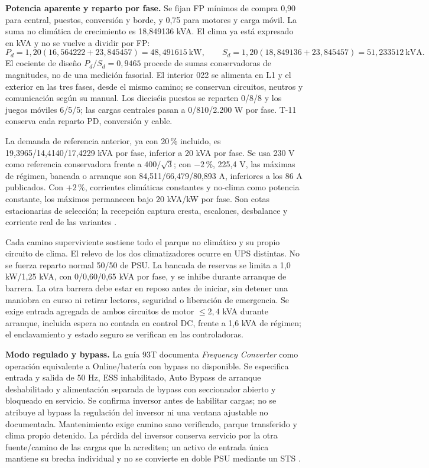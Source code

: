 \textbf{Potencia aparente y reparto por fase.} Se fijan FP mínimos de compra 0,90 para central, puestos, conversión y borde, y 0,75 para motores y carga móvil. La suma no climática de crecimiento es 18,849136 kVA. El clima ya está expresado en kVA y no se vuelve a dividir por FP:
\[
P_d=1,20(16,564222+23,845457)=48,491615\ \mathrm{kW},\qquad
S_d=1,20(18,849136+23,845457)=51,233512\ \mathrm{kVA}.
\]
El cociente de diseño $P_d/S_d=0,9465$ procede de sumas conservadoras de magnitudes, no de una medición fasorial. El interior 022 se alimenta en L1 y el exterior en las tres fases, desde el mismo camino; se conservan circuitos, neutros y comunicación según su manual. Los dieciséis puestos se reparten 0/8/8 y los juegos móviles 6/5/5; las cargas centrales pasan a 0/810/2.200 W por fase. T-11 conserva cada reparto PD, conversión y cable.

La demanda de referencia anterior, ya con 20\,\% incluido, es 19,3965/14,4140/17,4229 kVA por fase, inferior a 20 kVA por fase. Se usa 230 V como referencia conservadora frente a $400/\sqrt{3}$; con $-2\,\%$, 225,4 V, las máximas de régimen, bancada o arranque son 84,511/66,479/80,893 A, inferiores a los 86 A publicados. Con $+2\,\%$, corrientes climáticas constantes y no-clima como potencia constante, los máximos permanecen bajo 20 kVA/kW por fase. Son cotas estacionarias de selección; la recepción captura cresta, escalones, desbalance y corriente real de las variantes \parencites[pp.~3--4]{p7-eaton-93t-tecnica}[pp.~33--35]{p7-eaton-93t-guia}.

Cada camino superviviente sostiene todo el parque no climático y su propio circuito de clima. El relevo de los dos climatizadores ocurre en UPS distintas. No se fuerza reparto normal 50/50 de PSU. La bancada de reservas se limita a 1,0 kW/1,25 kVA, con 0/0,60/0,65 kVA por fase, y se inhibe durante arranque de barrera. La otra barrera debe estar en reposo antes de iniciar, sin detener una maniobra en curso ni retirar lectores, seguridad o liberación de emergencia. Se exige entrada agregada de ambos circuitos de motor $\leq2,4$ kVA durante arranque, incluida espera no contada en control DC, frente a 1,6 kVA de régimen; el enclavamiento y estado seguro se verifican en las controladoras.

\textbf{Modo regulado y bypass.} La guía 93T documenta \textit{Frequency Converter} como operación equivalente a Online/batería con bypass no disponible. Se especifica entrada y salida de 50 Hz, ESS inhabilitado, Auto Bypass de arranque deshabilitado y alimentación separada de bypass con seccionador abierto y bloqueado en servicio. Se confirma inversor antes de habilitar cargas; no se atribuye al bypass la regulación del inversor ni una ventana ajustable no documentada. Mantenimiento exige camino sano verificado, parque transferido y clima propio detenido. La pérdida del inversor conserva servicio por la otra fuente/camino de las cargas que la acrediten; un activo de entrada única mantiene su brecha individual y no se convierte en doble PSU mediante un STS \parencite[pp.~21/27/80]{p7-eaton-93t-guia}.

